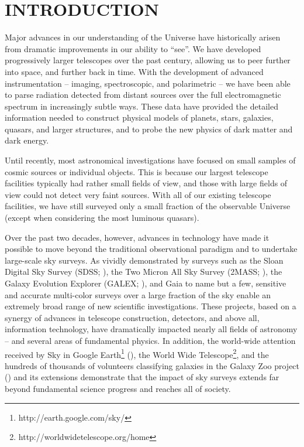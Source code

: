 \section{  INTRODUCTION}

Major advances in our understanding of the Universe have historically arisen
from dramatic improvements in our ability to ``see''. We have developed
progressively larger telescopes over the past century, allowing us
to peer further into space, and further back in time. With the development of
advanced instrumentation -- imaging, spectroscopic, and polarimetric -- we
have been able to parse radiation detected from distant sources over the
full electromagnetic spectrum in increasingly subtle ways.
These data have provided the detailed information needed to construct physical
models of planets, stars, galaxies, quasars, and larger structures, and to probe the
new physics of dark matter and dark energy.

Until recently, most astronomical investigations have focused on small samples
of cosmic sources or individual objects. This is because our largest telescope
facilities typically had rather small fields of view, and those with large
fields of view could not detect very faint sources. With all of our existing
telescope facilities, we have still surveyed only a small fraction of the
observable Universe (except when considering the most luminous quasars).

Over the past two decades, however, advances in technology have made it possible to
move beyond the traditional observational paradigm and to undertake large-scale
sky surveys. As vividly demonstrated by surveys such as the Sloan Digital Sky
Survey (SDSS; \cite{York2000}), the Two Micron All Sky Survey (2MASS; \cite{Skrutskie2006}),
the Galaxy Evolution Explorer (GALEX; \cite{Martin2006}),
and Gaia \cite{Gaia2016} to name but a few, sensitive and accurate
multi-color surveys over a large fraction of the sky enable an extremely broad range of
new scientific investigations. These projects, based on a synergy of advances in
telescope construction, detectors, and above all, information technology,
have dramatically impacted nearly all fields of astronomy
-- and several areas of fundamental physics. In addition, the world-wide attention
received by Sky in Google Earth\footnote{http://earth.google.com/sky/}
(\cite{Scranton2007}), the World Wide Telescope\footnote{http://worldwidetelescope.org/home},
and the hundreds of thousands of volunteers
classifying galaxies in the Galaxy Zoo project (\cite{GalaxyZoo})
and its extensions demonstrate that the impact of sky surveys extends
far beyond fundamental science progress and reaches all of society.

